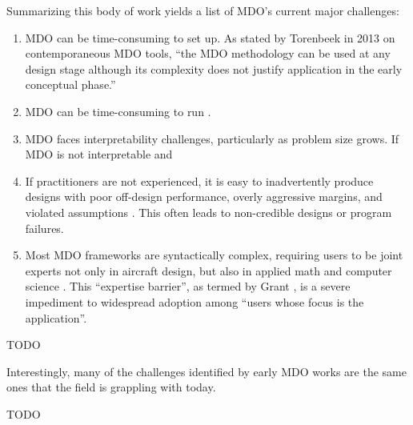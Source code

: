 \documentclass[12pt,vi,oneside]{report}
\begin{document}
    Summarizing this body of work yields a list of MDO's current major challenges:
    \begin{enumerate}
        \item MDO can be time-consuming to set up. As stated by Torenbeek in 2013 \cite{torenbeek_advanced_2013} on contemporaneous MDO tools, ``the MDO methodology can be used at any design stage although its complexity does not justify application in the early conceptual phase.''
        \item MDO can be time-consuming to run \cite{gpkit}.
        \item MDO faces interpretability challenges, particularly as problem size grows. If MDO is not interpretable and
        \item If practitioners are not experienced, it is easy to inadvertently produce designs with poor off-design performance, overly aggressive margins, and violated assumptions \cite{torenbeek_advanced_2013, drela_pros_1998, ozturk_optimal_2021}. This often leads to non-credible designs or program failures.
        \item Most MDO frameworks are syntactically complex, requiring users to be joint experts not only in aircraft design, but also in applied math and computer science \cite{salas_framework_1998, gpkit, agte_mdo_2010}. This ``expertise barrier'', as termed by Grant \cite{grant_disciplined_2006}, is a severe impediment to widespread adoption among ``users whose focus is the application''.
    \end{enumerate}

    TODO



    Interestingly, many of the challenges identified by early MDO works \cite{kroo_multidisciplinary_1997, ashley_making_1982} are the same ones that the field is grappling with today.


    \cite{salas_framework_1998} %

    TODO

\end{document}
